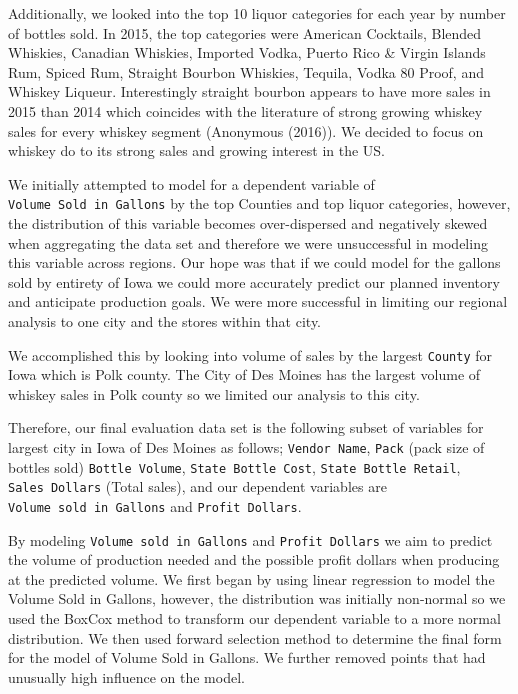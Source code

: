 \documentclass[]{elsarticle} %
\begin{document}
Additionally, we looked into the top 10 liquor categories for each year
by number of bottles sold. In 2015, the top categories were American
Cocktails, Blended Whiskies, Canadian Whiskies, Imported Vodka, Puerto
Rico \& Virgin Islands Rum, Spiced Rum, Straight Bourbon Whiskies,
Tequila, Vodka 80 Proof, and Whiskey Liqueur. Interestingly straight
bourbon appears to have more sales in 2015 than 2014 which coincides
with the literature of strong growing whiskey sales for every whiskey
segment (Anonymous (2016)). We decided to focus on whiskey do to its
strong sales and growing interest in the US.

We initially attempted to model for a dependent variable of
\texttt{Volume\ Sold\ in\ Gallons} by the top Counties and top liquor
categories, however, the distribution of this variable becomes
over-dispersed and negatively skewed when aggregating the data set and
therefore we were unsuccessful in modeling this variable across regions.
Our hope was that if we could model for the gallons sold by entirety of
Iowa we could more accurately predict our planned inventory and
anticipate production goals. We were more successful in limiting our
regional analysis to one city and the stores within that city.

We accomplished this by looking into volume of sales by the largest
\texttt{County} for Iowa which is Polk county. The City of Des Moines
has the largest volume of whiskey sales in Polk county so we limited our
analysis to this city.

Therefore, our final evaluation data set is the following subset of
variables for largest city in Iowa of Des Moines as follows;
\texttt{Vendor\ Name}, \texttt{Pack} (pack size of bottles sold)
\texttt{Bottle\ Volume}, \texttt{State\ Bottle\ Cost},
\texttt{State\ Bottle\ Retail}, \texttt{Sales\ Dollars} (Total sales),
and our dependent variables are \texttt{Volume\ sold\ in\ Gallons} and
\texttt{Profit\ Dollars}.

By modeling \texttt{Volume\ sold\ in\ Gallons} and
\texttt{Profit\ Dollars} we aim to predict the volume of production
needed and the possible profit dollars when producing at the predicted
volume. We first began by using linear regression to model the Volume
Sold in Gallons, however, the distribution was initially non-normal so
we used the BoxCox method to transform our dependent variable to a more
normal distribution. We then used forward selection method to determine
the final form for the model of Volume Sold in Gallons. We further
removed points that had unusually high influence on the model.
\end{document}
